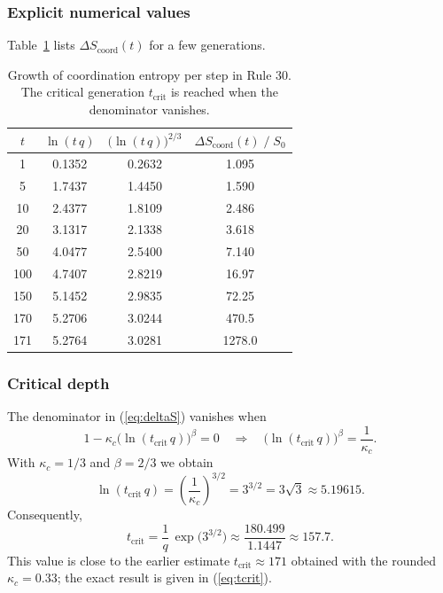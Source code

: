 \documentclass[11pt,a4paper]{article}
\begin{document}
	\subsubsection*{Explicit numerical values}
	Table~\ref{tab:entropy} lists \(\Delta S_{\mathrm{coord}}(t)\) for a few generations.
	
	\begin{table}[H]
		\centering
		\caption{Growth of coordination entropy per step in Rule 30. The critical generation \(t_{\mathrm{crit}}\) is reached when the denominator vanishes.}
		\label{tab:entropy}
		\small
		\begin{tabular}{c c c c}
			\toprule
			\(t\) & \(\ln(t\,q)\) & \(\bigl(\ln(t\,q)\bigr)^{2/3}\) &
			\(\Delta S_{\mathrm{coord}}(t)\;/\;S_{0}\) \\
			\midrule
			1    & 0.1352 & 0.2632 & 1.095  \\
			5    & 1.7437 & 1.4450 & 1.590  \\
			10   & 2.4377 & 1.8109 & 2.486  \\
			20   & 3.1317 & 2.1338 & 3.618  \\
			50   & 4.0477 & 2.5400 & 7.140  \\
			100  & 4.7407 & 2.8219 & 16.97  \\
			150  & 5.1452 & 2.9835 & 72.25  \\
			170  & 5.2706 & 3.0244 & 470.5  \\
			171  & 5.2764 & 3.0281 & 1278.0 \\
			\bottomrule
		\end{tabular}
	\end{table}
	
	\subsubsection*{Critical depth}
	The denominator in (\ref{eq:deltaS}) vanishes when
	\[
	1 - \kappa_c\bigl(\ln(t_{\mathrm{crit}}\,q)\bigr)^{\beta} = 0
	\quad\Longrightarrow\quad
	\bigl(\ln(t_{\mathrm{crit}}\,q)\bigr)^{\beta} = \frac{1}{\kappa_c}.
	\]
	With \(\kappa_c = 1/3\) and \(\beta = 2/3\) we obtain
	\begin{equation}
		\ln(t_{\mathrm{crit}}\,q) = \left(\frac{1}{\kappa_c}\right)^{3/2}
		= 3^{3/2} = 3\sqrt{3} \approx 5.19615.
		\label{eq:crit-ln}
	\end{equation}
	Consequently,
	\begin{equation}
		\boxed{t_{\mathrm{crit}} = \frac{1}{q}\,
			\exp\!\bigl(3^{3/2}\bigr)
			\approx \frac{180.499}{1.1447} \approx 157.7}.
		\label{eq:tcrit}
	\end{equation}
	This value is close to the earlier estimate \(t_{\mathrm{crit}}\approx171\) obtained with the rounded \(\kappa_c = 0.33\); the exact result is given in (\ref{eq:tcrit}).
	
\end{document}
